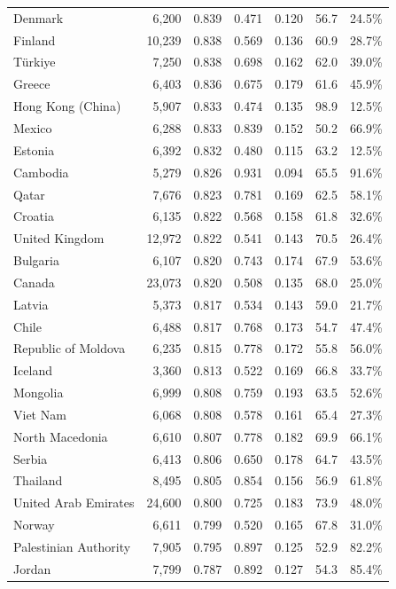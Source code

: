 \begin{table}[htp]
\begin{tabular}{@{}lrrrrrr@{}}
Denmark & 6,200 & 0.839 & 0.471 & 0.120 & 56.7 & 24.5\% \\
Finland & 10,239 & 0.838 & 0.569 & 0.136 & 60.9 & 28.7\% \\
Türkiye & 7,250 & 0.838 & 0.698 & 0.162 & 62.0 & 39.0\% \\
Greece & 6,403 & 0.836 & 0.675 & 0.179 & 61.6 & 45.9\% \\
Hong Kong (China) & 5,907 & 0.833 & 0.474 & 0.135 & 98.9 & 12.5\% \\
Mexico & 6,288 & 0.833 & 0.839 & 0.152 & 50.2 & 66.9\% \\
Estonia & 6,392 & 0.832 & 0.480 & 0.115 & 63.2 & 12.5\% \\
Cambodia & 5,279 & 0.826 & 0.931 & 0.094 & 65.5 & 91.6\% \\
Qatar & 7,676 & 0.823 & 0.781 & 0.169 & 62.5 & 58.1\% \\
Croatia & 6,135 & 0.822 & 0.568 & 0.158 & 61.8 & 32.6\% \\
United Kingdom & 12,972 & 0.822 & 0.541 & 0.143 & 70.5 & 26.4\% \\
Bulgaria & 6,107 & 0.820 & 0.743 & 0.174 & 67.9 & 53.6\% \\
Canada & 23,073 & 0.820 & 0.508 & 0.135 & 68.0 & 25.0\% \\
Latvia & 5,373 & 0.817 & 0.534 & 0.143 & 59.0 & 21.7\% \\
Chile & 6,488 & 0.817 & 0.768 & 0.173 & 54.7 & 47.4\% \\
Republic of Moldova & 6,235 & 0.815 & 0.778 & 0.172 & 55.8 & 56.0\% \\
Iceland & 3,360 & 0.813 & 0.522 & 0.169 & 66.8 & 33.7\% \\
Mongolia & 6,999 & 0.808 & 0.759 & 0.193 & 63.5 & 52.6\% \\
Viet Nam & 6,068 & 0.808 & 0.578 & 0.161 & 65.4 & 27.3\% \\
North Macedonia & 6,610 & 0.807 & 0.778 & 0.182 & 69.9 & 66.1\% \\
Serbia & 6,413 & 0.806 & 0.650 & 0.178 & 64.7 & 43.5\% \\
Thailand & 8,495 & 0.805 & 0.854 & 0.156 & 56.9 & 61.8\% \\
United Arab Emirates & 24,600 & 0.800 & 0.725 & 0.183 & 73.9 & 48.0\% \\
Norway & 6,611 & 0.799 & 0.520 & 0.165 & 67.8 & 31.0\% \\
Palestinian Authority & 7,905 & 0.795 & 0.897 & 0.125 & 52.9 & 82.2\% \\
Jordan & 7,799 & 0.787 & 0.892 & 0.127 & 54.3 & 85.4\% \\

\end{tabular}
\end{table}
